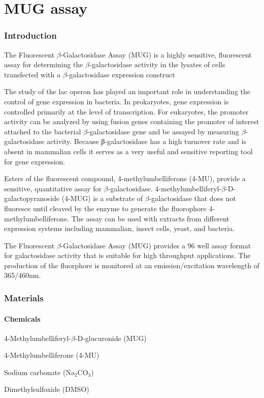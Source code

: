  \part{MUG assay}

\newpage
\setlength{\parindent}{0pt}
\setcounter{secnumdepth}{5}
\setcounter{section}{0}
\renewcommand*{\theHsection}{exy.\the\value{section}}
\section{Introduction}
The Fluorescent $\beta$-Galactosidase Assay (MUG) is a highly sensitive, fluorescent assay for determining the $\beta$-galactosidase activity in the lysates of cells transfected with a $\beta$-galactosidase expression construct
 
The study of the lac operon has played an important role in understanding the control of gene expression in bacteria. In prokaryotes, gene expression is controlled primarily at the level of transcription. For eukaryotes, the promoter activity can be analyzed by using fusion genes containing the promoter of interest attached to the bacterial $\beta$-galactosidase gene and be assayed by measuring $\beta$-galactosidase activity. Because β-galactosidase has a high turnover rate and is absent in mammalian cells it serves as a very useful and sensitive reporting tool for gene expression.
 
Esters of the fluorescent compound, 4-methylumbelliferone (4-MU), provide a sensitive, quantitative assay for $\beta$-galactosidase.  4-methylumbelliferyl-$\beta$-D-galactopyranoside (4-MUG) is a substrate of $\beta$-galactosidase that does not fluoresce until cleaved by the enzyme to generate the fluorophore 4-methylumbelliferone.  The assay can be used with extracts from different expression systems including mammalian, insect cells, yeast, and bacteria.
 
The Fluorescent $\beta$-Galactosidase Assay (MUG) provides a 96 well assay format for galactosidase activity that is suitable for high throughput applications.  The production of the fluorphore is monitored at an emission/excitation wavelength of 365/460nm.
\section{Materials}
	\subsection{Chemicals}
	\begin{packed_enum}
	\item 4-Methylumbelliferyl-{$\beta$}-D-glucuronide (MUG)
	\item 4-Methylumbelliferone (4-MU)
	\item Sodium carbonate (Na$_{2}$CO$_{3}$)
	\item Dimethylsulfoxide (DMSO)
	\end{packed_enum}
		
